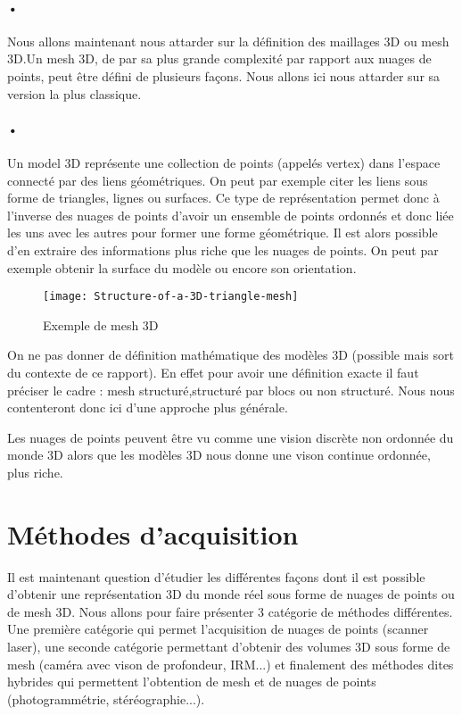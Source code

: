 \paragraph{•} Nous allons maintenant nous attarder sur la définition des maillages 3D ou mesh 3D.Un mesh 3D, de par sa plus grande complexité par rapport aux nuages de points, peut être défini de plusieurs façons. Nous allons ici nous attarder sur sa version la plus classique.
\paragraph{•} Un model 3D représente une collection de points (appelés vertex) dans l'espace connecté par des liens géométriques. On peut par exemple citer les liens sous forme de triangles, lignes ou surfaces.
Ce type de représentation permet donc à l'inverse des nuages de points d'avoir un ensemble de points ordonnés et donc liée les uns avec les autres pour former une forme géométrique. Il est alors possible d'en extraire des informations plus riche que les nuages de points. On peut par exemple obtenir la surface du modèle ou encore son orientation.



\begin{figure}[h]
    \centering
    \texttt{[image: Structure-of-a-3D-triangle-mesh]}
    \caption{Exemple de mesh 3D}
    \label{fig:Structure-of-a-3D-triangle-mesh}
\end{figure}



On ne pas donner de définition mathématique des modèles 3D (possible mais sort du contexte de ce rapport). En effet pour avoir une définition exacte il faut préciser le cadre : mesh structuré,structuré par blocs ou non structuré.
Nous nous contenteront donc ici d'une approche plus générale.

Les nuages de points peuvent être vu comme une vision discrète non ordonnée du monde 3D alors que les modèles 3D nous donne une vison continue ordonnée, plus riche.
\FloatBarrier


\section{Méthodes d'acquisition}
Il est maintenant question d'étudier les différentes façons dont il est possible d'obtenir une représentation 3D du monde réel sous forme de nuages de points ou de mesh 3D. Nous allons pour faire présenter 3 catégorie de méthodes différentes. Une première catégorie qui permet l'acquisition de nuages de points (scanner laser), une seconde catégorie permettant d'obtenir des volumes 3D sous forme de mesh (caméra avec vison de profondeur, IRM...) et finalement des méthodes dites hybrides qui permettent l'obtention de mesh et de nuages de points (photogrammétrie, stéréographie...).


